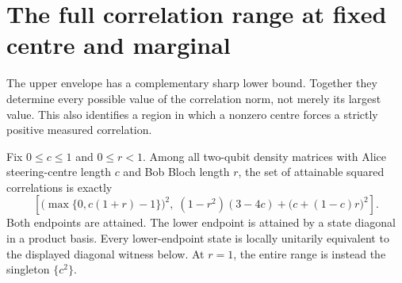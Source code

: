 \section{The full correlation range at fixed centre and marginal}
\label{sec:jointrange}
The upper envelope has a complementary sharp lower bound. Together they
determine every possible value of the correlation norm, not merely its
largest value. This also identifies a region in which a nonzero centre
forces a strictly positive measured correlation.

\begin{theorem}\label{thm:jointrange}
Fix $0\leq c\leq1$ and $0\leq r<1$. Among all two-qubit density matrices
with Alice steering-centre length $c$ and Bob Bloch length $r$, the set of
attainable squared correlations is exactly
\begin{equation}\label{eq:jointinterval}
\left[\bigl(\max\{0,c(1+r)-1\}\bigr)^2,\;
 (1-r^2)(3-4c)+\bigl(c+(1-c)r\bigr)^2\right].
\end{equation}
Both endpoints are attained. The lower endpoint is attained by a state
diagonal in a product basis. Every lower-endpoint state is locally unitarily
equivalent to the displayed diagonal witness below. At $r=1$, the entire
range is instead the singleton $\{c^2\}$.
\end{theorem}

